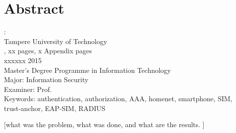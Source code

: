 \documentclass[12pt,a4paper,english]{tutthesis}
\begin{document}
\if@twoside
\clearpage
\fi


\setcounter{page}{0} %

\chapter*{Abstract}

\begin{spacing}{1.0}
  {\bf \textsf{\MakeUppercase{\@author}}}: \@title\\   %
   \textsf{Tampere University of Technology}\\
   \textsf{\@thesistype, xx pages, x Appendix pages} \\
   \textsf{xxxxxx 2015}\\
   \textsf{Master's Degree Programme in Information Technology}\\
   \textsf{Major: Information Security}\\
   \textsf{Examiner: Prof. \@examiner}\\ %
   \textsf{Keywords: authentication, authorization, AAA, homenet, smartphone, SIM, trust-anchor, EAP-SIM, RADIUS}\\
\end{spacing}

[what was the problem, what was done, and what are the results. ]
\end{document}
